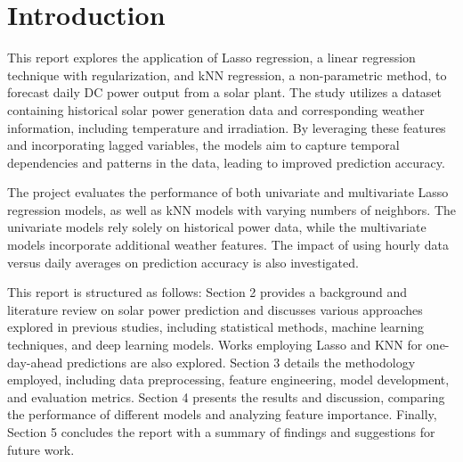 \section{Introduction}
This report explores the application of Lasso regression, a linear regression technique with regularization, and kNN regression, a non-parametric method, to forecast daily DC power output from a solar plant. The study utilizes a dataset containing historical solar power generation data and corresponding weather information, including temperature and irradiation. By leveraging these features and incorporating lagged variables, the models aim to capture temporal dependencies and patterns in the data, leading to improved prediction accuracy.

The project evaluates the performance of both univariate and multivariate Lasso regression models, as well as kNN models with varying numbers of neighbors. The univariate models rely solely on historical power data, while the multivariate models incorporate additional weather features. The impact of using hourly data versus daily averages on prediction accuracy is also investigated.

This report is structured as follows: Section 2 provides a background and literature review on solar power prediction and discusses various approaches explored in previous studies, including statistical methods, machine learning techniques, and deep learning models. Works employing Lasso and KNN for one-day-ahead predictions are also explored. Section 3 details the methodology employed, including data preprocessing, feature engineering, model development, and evaluation metrics. Section 4 presents the results and discussion, comparing the performance of different models and analyzing feature importance. Finally, Section 5 concludes the report with a summary of findings and suggestions for future work.